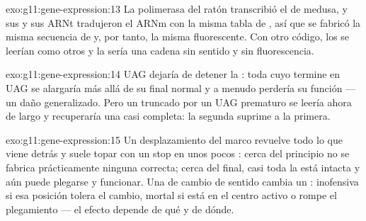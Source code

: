 \begin{solution}{exo:g11:gene-expression:13}
La  polimerasa del ratón transcribió el  de medusa, y sus
 y sus ARNt tradujeron el ARNm con la misma tabla de ,
así que se fabricó la misma secuencia de  y, por tanto, la
misma  fluorescente. Con otro código, los  se leerían
como otros  y la  sería una cadena sin sentido y sin
fluorescencia.
\end{solution}

\begin{solution}{exo:g11:gene-expression:14}
UAG dejaría de detener la : toda  cuyo  termine en
UAG se alargaría más allá de su final normal y a menudo perdería su
función --- un daño generalizado. Pero un  truncado por un UAG
prematuro se leería ahora de largo y recuperaría una  casi
completa: la segunda  suprime a la primera.
\end{solution}

\begin{solution}{exo:g11:gene-expression:15}
Un desplazamiento del marco revuelve todo lo que viene detrás y suele
topar con un stop en unos pocos : cerca del principio no se
fabrica prácticamente ninguna  correcta; cerca del final, casi
toda la  está intacta y aún puede plegarse y funcionar. Una
 de cambio de sentido cambia un : inofensiva si esa
posición tolera el cambio, mortal si está en el centro activo o rompe
el plegamiento --- el efecto depende de qué  y de dónde.
\end{solution}

